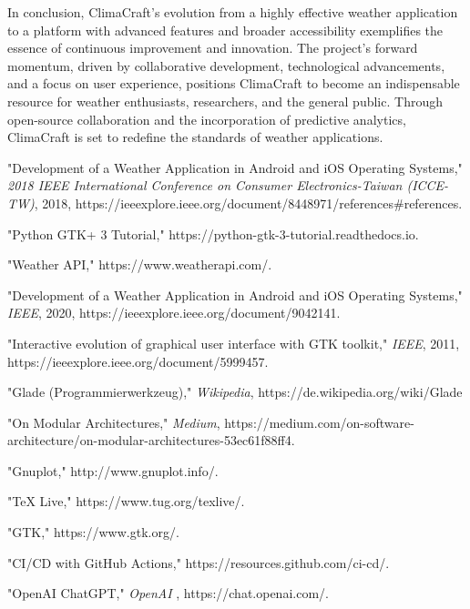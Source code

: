 \documentclass[sn-mathphys-num]{sn-jnl}%
\begin{document}
In conclusion, ClimaCraft's evolution from a highly effective weather application to a platform with advanced features and broader accessibility exemplifies the essence of continuous improvement and innovation. The project's forward momentum, driven by collaborative development, technological advancements, and a focus on user experience, positions ClimaCraft to become an indispensable resource for weather enthusiasts, researchers, and the general public. Through open-source collaboration and the incorporation of predictive analytics, ClimaCraft is set to redefine the standards of weather applications.

\begin{thebibliography}{99}

"Development of a Weather Application in Android and iOS Operating Systems," \emph{2018 IEEE International Conference on Consumer Electronics-Taiwan (ICCE-TW)}, 2018, https://ieeexplore.ieee.org/document/8448971/references\#references.

"Python GTK+ 3 Tutorial," https://python-gtk-3-tutorial.readthedocs.io.

"Weather API," https://www.weatherapi.com/.

"Development of a Weather Application in Android and iOS Operating Systems," \emph{IEEE}, 2020, https://ieeexplore.ieee.org/document/9042141.

"Interactive evolution of graphical user interface with GTK toolkit," \emph{IEEE}, 2011, https://ieeexplore.ieee.org/document/5999457.

"Glade (Programmierwerkzeug)," \emph{Wikipedia}, https://de.wikipedia.org/wiki/Glade

"On Modular Architectures," \emph{Medium}, https://medium.com/on-software-architecture/on-modular-architectures-53ec61f88ff4.

"Gnuplot," http://www.gnuplot.info/.

"TeX Live," https://www.tug.org/texlive/.

"GTK," https://www.gtk.org/.

"CI/CD with GitHub Actions," https://resources.github.com/ci-cd/.

"OpenAI ChatGPT," \emph{OpenAI }, https://chat.openai.com/.

\end{thebibliography}
\end{document}
